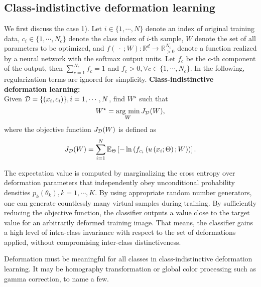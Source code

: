\documentclass[10pt,twocolumn,letterpaper]{article}
\newcommand{\argmin}{\mathop{\rm arg~min}\limits}
\begin{document}
\subsection{Class-indistinctive deformation learning}

We first discuss the case 1). 
Let $i\in\{1,\cdots,N\}$ denote an index of original training data, 
$c_i\in\{1,\cdots,N_c\}$ denote the class index of $i$-th sample,
$W$ denote the set of all parameters to be optimized, and
$f(~\cdot~; W): \mathbb{R}^{d} \rightarrow \mathbb{R}_{>0}^{N_c}$ denote a function realized by a neural network with the softmax output units.
Let $f_c$ be the $c$-th component of the output, then
$\sum_{c=1}^{N_c} f_c = 1$ and $f_c > 0, \forall c \in \{1,\cdots, N_c\}$.
In the following, regularization terms are ignored for simplicity.
\newline
\newline
{\bf Class-indistinctive deformation learning:} \\
Given ${\cal D} = \{ (x_i, c_i) \}, i=1,\cdots,N$, find $W^\star$ such that
\begin{equation}
W^\star = \argmin_W J_{\cal D}(W),
\end{equation}
where the objective function $J_{\cal D}(W)$ is defined as
\begin{equation}
J_{\cal D}(W) = \sum_{i=1}^N \mathbb{E}_\Theta
\left[ - \ln \left( f_{c_i} \left( u \left( x_i; \Theta \right); W \right) \right) \right].
\label{eq-2}
\end{equation}

The expectation value is computed by marginalizing the cross entropy over 
deformation parameters that independently obey unconditional probability
densities $p_k(\theta_k), k=1, \cdots, K$.
By using appropriate random number generators, one can generate countlessly many virtual samples during training.
By sufficiently reducing the objective function, 
the classifier outputs a value close to the target value for an arbitrarily deformed training image.
That means, the classifier gains a high level of intra-class invariance with respect to the set of deformations applied,
without compromising inter-class distinctiveness.

Deformation must be meaningful for all classes in class-indistinctive deformation learning.
It may be homography transformation or global color processing such as gamma correction, to name a few.
\end{document}
